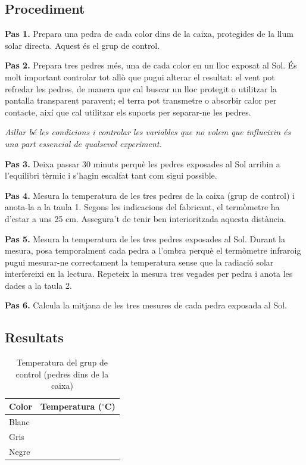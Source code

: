 \subsection{Procediment}

\textbf{Pas 1.} Prepara una pedra de cada color dins de la caixa, protegides de la llum solar directa. Aquest és el grup de control.

\textbf{Pas 2.} Prepara tres pedres més, una de cada color en un lloc exposat al Sol. És molt important controlar tot allò que pugui alterar el resultat: el vent pot refredar les pedres, de manera que cal buscar un lloc protegit o utilitzar la pantalla transparent paravent; el terra pot transmetre o absorbir calor per contacte, així que cal utilitzar els suports per separar-ne les pedres.

\textit{Aïllar bé les condicions i controlar les variables que no volem que influeixin és una part essencial de qualsevol experiment.}

\textbf{Pas 3.} Deixa passar 30 minuts perquè les pedres exposades al Sol arribin a l’equilibri tèrmic i s’hagin escalfat tant com sigui possible.

\textbf{Pas 4.} Mesura la temperatura de les tres pedres de la caixa (grup de control) i anota-la a la taula 1. Segons les indicacions del fabricant, el termòmetre ha d’estar a uns 25 cm. Assegura’t de tenir ben interioritzada aquesta distància.

\textbf{Pas 5.} Mesura la temperatura de les tres pedres exposades al Sol. Durant la mesura, posa temporalment cada pedra a l’ombra perquè el termòmetre infraroig pugui mesurar-ne correctament la temperatura sense que la radiació solar interfereixi en la lectura. Repeteix la mesura tres vegades per pedra i anota les dades a la taula 2.

\textbf{Pas 6.} Calcula la mitjana de les tres mesures de cada pedra exposada al Sol.

\subsection{Resultats}


\renewcommand{\arraystretch}{2.4}

\begin{table}[h]
\centering
\caption{Temperatura del grup de control (pedres dins de la caixa)}

\begin{tabular}{|>{\centering\arraybackslash}m{1.5cm}|>{\centering\arraybackslash}m{3.3cm}|}
\hline
\textbf{Color} & \textbf{Temperatura ($^\circ$C)} \\
\hline
Blanc & \\
\hline
Gris & \\
\hline
Negre & \\
\hline
\end{tabular}

\end{table}

